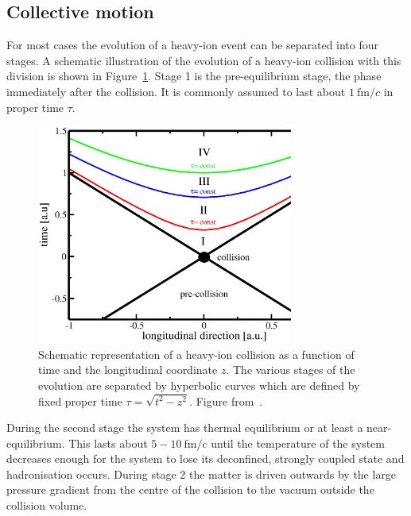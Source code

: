 \subsection{Collective motion}
\label{sec:collective}
For most cases the evolution of a heavy-ion event can be separated into four stages. A schematic illustration of the evolution of a heavy-ion collision with this division is shown in Figure~\ref{fig:HISpaceTime}. Stage 1 is the pre-equilibrium stage, the phase immediately after the collision. It is commonly assumed to last about $1\ \mathrm{fm}/c$ in proper time $\tau$. 

\begin{figure}[htb]
\centering
               \includegraphics[width=0.75\textwidth]{figures/HISpaceTime2}
        \caption[Schematic representation of a heavy-ion collision]{Schematic representation of a heavy-ion collision as a function of time and the longitudinal coordinate $z$. The various stages of the evolution are separated by hyperbolic curves which are defined by fixed proper time $\tau=\sqrt{t^2-z^2}$. Figure from~\cite{Romatschke:2009im}.}
        	\label{fig:HISpaceTime}
\end{figure}

During the second stage the system has thermal equilibrium or at least a near-equilibrium. This lasts about $5-10\ \mathrm{fm}/c$ until the temperature of the system decreases enough for the system to lose its deconfined, strongly coupled state and hadronisation occurs. During stage 2 the matter is driven outwards by the large pressure gradient from the centre of the collision to the vacuum outside the collision volume. 

